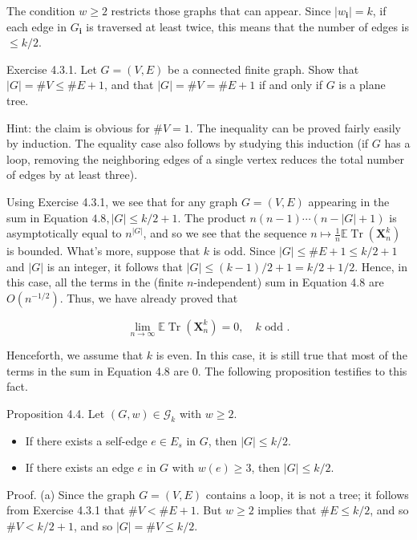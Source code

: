 \documentclass[10pt]{article}
\begin{document}
The condition $w \geq 2$ restricts those graphs that can appear. Since $\left|w_{\mathbf{i}}\right|=k$, if each edge in $G_{\mathbf{i}}$ is traversed at least twice, this means that the number of edges is $\leq k / 2$.

Exercise 4.3.1. Let $G=(V, E)$ be a connected finite graph. Show that $|G|=\# V \leq \# E+1$, and that $|G|=\# V=\# E+1$ if and only if $G$ is a plane tree.

Hint: the claim is obvious for $\# V=1$. The inequality can be proved fairly easily by induction. The equality case also follows by studying this induction (if $G$ has a loop, removing the neighboring edges of a single vertex reduces the total number of edges by at least three).

Using Exercise 4.3.1, we see that for any graph $G=(V, E)$ appearing in the sum in Equation $4.8,|G| \leq k / 2+1$. The product $n(n-1) \cdots(n-|G|+1)$ is asymptotically equal to $n^{|G|}$, and so we see that the sequence $n \mapsto \frac{1}{n} \mathbb{E} \operatorname{Tr}\left(\mathbf{X}_{n}^{k}\right)$ is bounded. What's more, suppose that $k$ is odd. Since $|G| \leq \# E+1 \leq k / 2+1$ and $|G|$ is an integer, it follows that $|G| \leq(k-1) / 2+1=k / 2+1 / 2$. Hence, in this case, all the terms in the (finite $n$-independent) sum in Equation 4.8 are $O\left(n^{-1 / 2}\right)$. Thus, we have already proved that

$$
\lim _{n \rightarrow \infty} \mathbb{E} \operatorname{Tr}\left(\mathbf{X}_{n}^{k}\right)=0, \quad k \text { odd } .
$$

Henceforth, we assume that $k$ is even. In this case, it is still true that most of the terms in the sum in Equation 4.8 are 0. The following proposition testifies to this fact.

Proposition 4.4. Let $(G, w) \in \mathcal{G}_{k}$ with $w \geq 2$.

\begin{itemize}
  \item[(a)] If there exists a self-edge $e \in E_{s}$ in $G$, then $|G| \leq k / 2$.
  \item[(b)] If there exists an edge $e$ in $G$ with $w(e) \geq 3$, then $|G| \leq k / 2$.
\end{itemize}

Proof. (a) Since the graph $G=(V, E)$ contains a loop, it is not a tree; it follows from Exercise 4.3.1 that $\# V<\# E+1$. But $w \geq 2$ implies that $\# E \leq k / 2$, and so $\# V<k / 2+1$, and so $|G|=\# V \leq k / 2$.
\end{document}
